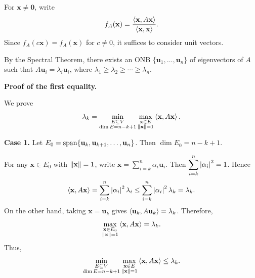 \begin{pfbox}
For $\mathbf{x}\neq \mathbf{0}$, write
\[
    f_A(\mathbf{x})
    =
    \frac{\left\langle \mathbf{x}, A\mathbf{x} \right\rangle}
         {\left\langle \mathbf{x}, \mathbf{x} \right\rangle}.
\]
Since $f_A(c\mathbf{x})=f_A(\mathbf{x})$ for $c\neq 0$, it suffices to consider
unit vectors.

By the Spectral Theorem, there exists an ONB
$\{\mathbf{u}_1,\ldots,\mathbf{u}_n\}$ of eigenvectors of $A$ such that
$A\mathbf{u}_i=\lambda_i\mathbf{u}_i$, where
$\lambda_1\ge \lambda_2\ge \cdots \ge \lambda_n$.

\medskip

\textbf{Proof of the first equality.}

We prove
\[
    \lambda_k
    =
    \min_{\substack{E\subseteq V\\ \dim E=n-k+1}}
    \max_{\substack{\mathbf{x}\in E\\ \left\lVert \mathbf{x} \right\rVert=1}}
    \left\langle \mathbf{x}, A\mathbf{x} \right\rangle.
\]

\textbf{Case 1.}  
Let $E_0=\operatorname{span}\{\mathbf{u}_k,\mathbf{u}_{k+1},\ldots,\mathbf{u}_n\}$.
Then $\dim E_0=n-k+1$.

For any $\mathbf{x}\in E_0$ with $\left\lVert \mathbf{x} \right\rVert=1$, write
$\mathbf{x}=\displaystyle\sum_{i=k}^n \alpha_i\mathbf{u}_i$. Then
$\displaystyle\sum_{i=k}^n \left\lvert \alpha_i \right\rvert^2=1$. Hence
\[
    \left\langle \mathbf{x}, A\mathbf{x} \right\rangle
    =
    \sum_{i=k}^n \left\lvert \alpha_i \right\rvert^2\lambda_i
    \le
    \sum_{i=k}^n \left\lvert \alpha_i \right\rvert^2\lambda_k
    =
    \lambda_k.
\]
On the other hand, taking $\mathbf{x}=\mathbf{u}_k$ gives
$\left\langle \mathbf{u}_k, A\mathbf{u}_k \right\rangle=\lambda_k$. Therefore,
\[
    \max_{\substack{\mathbf{x}\in E_0\\ \left\lVert \mathbf{x} \right\rVert=1}}
    \left\langle \mathbf{x}, A\mathbf{x} \right\rangle
    =
    \lambda_k.
\]
Thus,
\[
    \min_{\substack{E\subseteq V\\ \dim E=n-k+1}}
    \max_{\substack{\mathbf{x}\in E\\ \left\lVert \mathbf{x} \right\rVert=1}}
    \left\langle \mathbf{x}, A\mathbf{x} \right\rangle
    \le
    \lambda_k.
\]


\end{pfbox}
